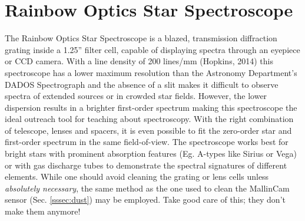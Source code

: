 \documentclass[12pt,titlepage]{article}
\begin{document}
\section{Rainbow Optics Star Spectroscope}
The Rainbow Optics Star Spectroscope is a blazed, transmission diffraction grating inside a 1.25'' filter cell,
capable of displaying spectra through an eyepiece or CCD camera.
With a line density of 200 lines/mm (Hopkins, 2014\cite{hopkins_spec}) this spectroscope has a lower maximum resolution than the Astronomy
Department's DADOS Spectrograph and the absence of a slit makes it difficult to observe spectra
of extended sources or in crowded star fields. However, the lower dispersion results in a brighter
first-order spectrum making this spectroscope the ideal outreach tool for teaching about spectroscopy.
With the right combination of telescope, lenses and spacers, it is even possible to fit the zero-order star
and first-order spectrum in the same field-of-view. The spectroscope works best for bright stars with prominent
absorption features (Eg. A-types like Sirius or Vega) or with gas discharge tubes to demonstrate the spectral signatures of different elements. 
While one should avoid cleaning the grating or lens cells unless \textit{absolutely necessary},
the same method as the one used to clean the MallinCam sensor (Sec. \ref{sssec:dust}) may be employed.
Take good care of this; they don't make them anymore!

\end{document}

